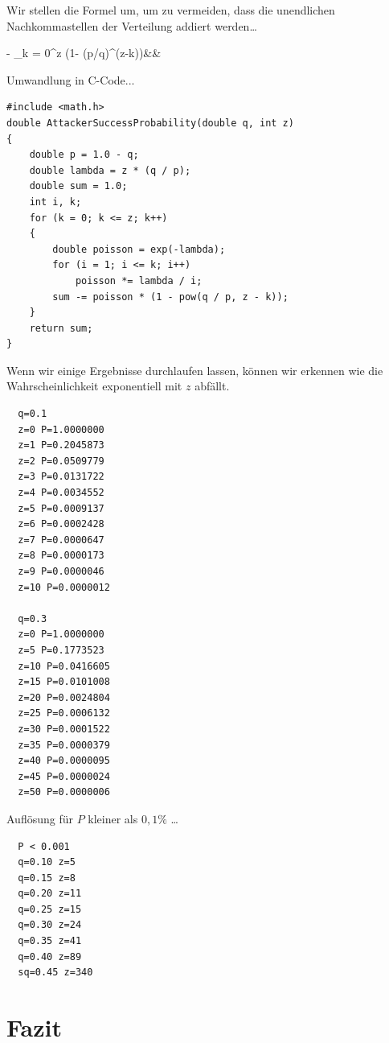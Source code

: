 \documentclass[9pt]{article}
\begin{document}
	\noindent Wir stellen die Formel um, um zu vermeiden, dass die unendlichen Nachkommastellen der Verteilung addiert werden…
	
	\begin{flalign*}
 - \sum_{k = 0}^{z}  (1- (p/q)^{(z-k)})&&
	\end{flalign*}
	\vspace{2mm}
	
	\noindent Umwandlung in C-Code...
	
	\begin{verbatim}
#include <math.h>
double AttackerSuccessProbability(double q, int z)
{
    double p = 1.0 - q;
    double lambda = z * (q / p);
    double sum = 1.0;
    int i, k;
    for (k = 0; k <= z; k++)
    {
        double poisson = exp(-lambda);
        for (i = 1; i <= k; i++)
            poisson *= lambda / i;
        sum -= poisson * (1 - pow(q / p, z - k));
    }
    return sum;
}
	\end{verbatim}
	
	\newpage
	
	\noindent Wenn wir einige Ergebnisse durchlaufen lassen, können wir erkennen wie die Wahrscheinlichkeit exponentiell mit $z$ abfällt.
	
	\begin{verbatim}
  q=0.1
  z=0 P=1.0000000
  z=1 P=0.2045873
  z=2 P=0.0509779
  z=3 P=0.0131722
  z=4 P=0.0034552
  z=5 P=0.0009137
  z=6 P=0.0002428
  z=7 P=0.0000647
  z=8 P=0.0000173
  z=9 P=0.0000046
  z=10 P=0.0000012

  q=0.3
  z=0 P=1.0000000
  z=5 P=0.1773523
  z=10 P=0.0416605
  z=15 P=0.0101008
  z=20 P=0.0024804
  z=25 P=0.0006132
  z=30 P=0.0001522
  z=35 P=0.0000379
  z=40 P=0.0000095
  z=45 P=0.0000024
  z=50 P=0.0000006
	\end{verbatim}
	
	\noindent Auflösung für $P$ kleiner als $0,1\%$ …
	
	\begin{verbatim}
  P < 0.001
  q=0.10 z=5
  q=0.15 z=8
  q=0.20 z=11
  q=0.25 z=15
  q=0.30 z=24
  q=0.35 z=41
  q=0.40 z=89
  sq=0.45 z=340
	\end{verbatim}
	
	\section{Fazit}
	
\end{document}

